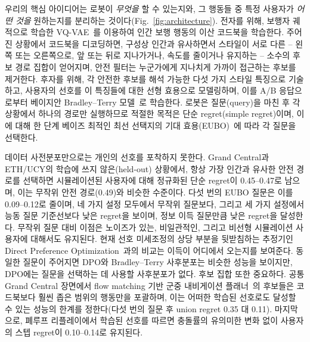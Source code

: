우리의 핵심 아이디어는 로봇이 \emph{무엇을} 할 수 있는지와, 그 행동들 중 특정 사용자가 \emph{어떤 것을} 원하는지를 분리하는 것이다(Fig.~\ref{fig:architecture}).
전자를 위해, 보행자 궤적으로 학습한 VQ-VAE~\citep{vandenoord2017neural}를 이용하여 인간 보행 행동의 이산 코드북을 학습한다. 주어진 상황에서
코드북을 디코딩하면, 구성상 인간과 유사하면서 스타일이 서로 다른 -- 왼쪽 또는 오른쪽으로, 앞 또는 뒤로 지나가거나, 속도를 줄이거나 유지하는 --
소수의 후보 경로 집합이 얻어지며, 안전 필터는 누군가에게 지나치게 가까이 접근하는 후보를 제거한다. 후자를 위해, 각 안전한 후보를 해석 가능한
다섯 가지 스타일 특징으로 기술하고, 사용자의 선호를 이 특징들에 대한 선형 효용으로 모델링하며, 이를 A/B 응답으로부터 베이지안 Bradley--Terry
모델~\citep{bradley1952rank}로 학습한다. 로봇은 질문(query)을 마친 후 각 상황에서 하나의 경로만 실행하므로 적절한 목적은 단순 regret(simple regret)이며,
이에 대해 한 단계 베이즈 최적인 최선 선택지의 기대 효용(EUBO)~\citep{astudillo2023qeubo}에 따라 각 질문을 선택한다.

데이터 사전분포만으로는 개인의 선호를 포착하지 못한다. Grand Central과 ETH/UCY의 학습에 쓰지 않은(held-out) 상황에서, 항상 가장 인간과 유사한
안전 경로를 선택하면 시뮬레이션된 사용자에 대해 정규화된 단순 regret이 0.45--0.47로 남으며, 이는 무작위 안전 경로(0.49)와 비슷한 수준이다. 다섯 번의 EUBO
질문은 이를 0.09--0.12로 줄이며, 네 가지 설정 모두에서 무작위 질문보다, 그리고 세 가지 설정에서 능동 질문 기준선보다 낮은 regret을 보이며,
정보 이득 질문만큼 낮은 regret을 달성한다. 무작위 질문 대비 이점은 노이즈가 있는, 비일관적인, 그리고 비선형 시뮬레이션 사용자에 대해서도 유지된다.
현재 선호 미세조정의 상당 부분을 뒷받침하는 추정기인 Direct Preference Optimization~\citep{rafailov2023direct}과의 비교는
이득이 어디에서 오는지를 보여준다. 동일한 질문이 주어지면 DPO와 Bradley--Terry 사후분포는 비슷한 성능을 보이지만, DPO에는 질문을 선택하는 데
사용할 사후분포가 없다. 후보 집합 또한 중요하다. 공통 Grand Central 장면에서 flow matching 기반
군중 내비게이션 플래너~\citep{singha2026crowdfm}의 후보들은 코드북보다 훨씬 좁은 범위의 행동만을 포괄하며, 이는 어떠한 학습된 선호로도 달성할 수 있는 성능의
한계를 정한다(다섯 번의 질문 후 union regret 0.35 대 0.11). 마지막으로, 폐루프 리플레이에서 학습된 선호를 따르면 충돌률의 유의미한 변화 없이
사용자의 스텝 regret이 0.10--0.14로 유지된다.

